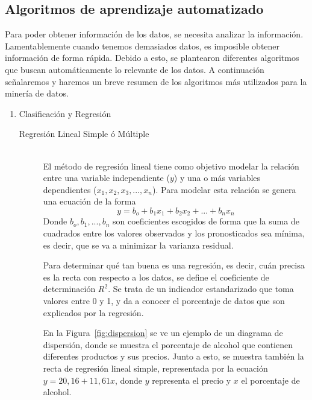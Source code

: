 \subsection{Algoritmos de aprendizaje automatizado}
Para poder obtener información de los datos, se necesita analizar la información. Lamentablemente cuando tenemos demasiados datos, es imposible obtener información de forma rápida. Debido a esto, se plantearon diferentes algoritmos que buscan automáticamente lo relevante de los datos.
A continuación señalaremos y haremos un breve resumen de los algoritmos más utilizados para la minería de datos.

\begin{enumerate}
  \item Clasificación y Regresión
    \begin{description}
      \item[Regresión Lineal Simple ó Múltiple] \hfill \\
      El método de regresión lineal tiene como objetivo modelar la relación entre una variable independiente ($y$) y una o más variables dependientes ($x_1, x_2, x_3,...,x_n$). Para modelar esta relación se genera una ecuación de la forma 
      \begin{equation}\label{rlineal}
      y= b_o + b_1 x_1 + b_2 x_2 + ... + b_n x_n 
      \end{equation}
      Donde $b_o,b_1,...,b_n$ son coeficientes escogidos de forma que la suma de cuadrados entre los valores observados y los pronosticados sea mínima, es decir, que se va a minimizar la varianza residual.
      
      Para determinar qué tan buena es una regresión, es decir, cuán precisa es la recta con respecto a los datos, se define el coeficiente de determinación $R^2$. Se trata de un indicador estandarizado que toma valores entre 0 y 1, y da a conocer el porcentaje de datos que son explicados por la regresión. 
      
      En la Figura~\ref{fig:dispersion} se ve un ejemplo de un diagrama de dispersión, donde se muestra el porcentaje de alcohol que contienen diferentes productos y sus precios. Junto a esto, se muestra también la recta de regresión lineal simple, representada por la ecuación $y=20,16+11,61x$, donde $y$ representa el precio y $x$ el porcentaje de alcohol.
      

\end{description}
\end{enumerate}
